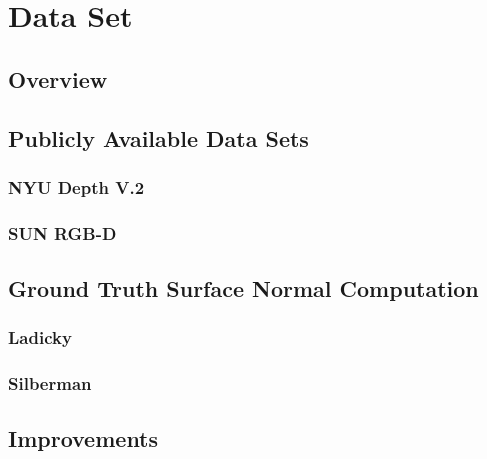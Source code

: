 \chapter{Data Set}
\label{Dataset}

\section{Overview}
\section{Publicly Available Data Sets }
\subsection{NYU Depth V.2}
\subsection{SUN RGB-D}
\section{Ground Truth Surface Normal Computation}
\subsection{Ladicky}
\subsection{Silberman}
\section{Improvements}

